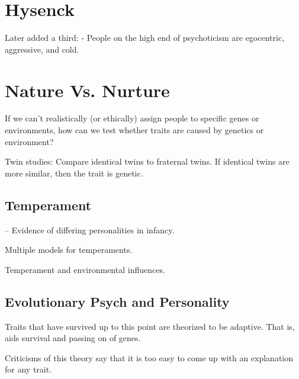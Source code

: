 \section{Hysenck}

\begin{coloredlist}
    \item {}
    \item {}
    \item Later added a third:  - People on the high end of psychoticism are egocentric, aggressive, and cold.
\end{coloredlist}

\section{Nature Vs. Nurture}

\begin{coloredlist}
    \item If we can't realistically (or ethically) assign people to specific genes or environments, how can we test whether traits are caused by genetics or environment?
    \item Twin studies: Compare identical twins to fraternal twins. If identical twins are more similar, then the trait is genetic.
\end{coloredlist}

\subsection{Temperament}

\begin{coloredlist}
    \item {} -- Evidence of differing personalities in infancy.
    \begin{coloredlist}
        \item Multiple models for temperaments.
        \item Temperament and environmental influences.
    \end{coloredlist}
\end{coloredlist}

\subsection{Evolutionary Psych and Personality}

\begin{coloredlist}
    \item Traits that have survived up to this point are theorized to be adaptive. That is, aids survival and passing on of genes.
    \item Criticisms of this theory say that it is too easy to come up with an explanation for any trait.
\end{coloredlist}


